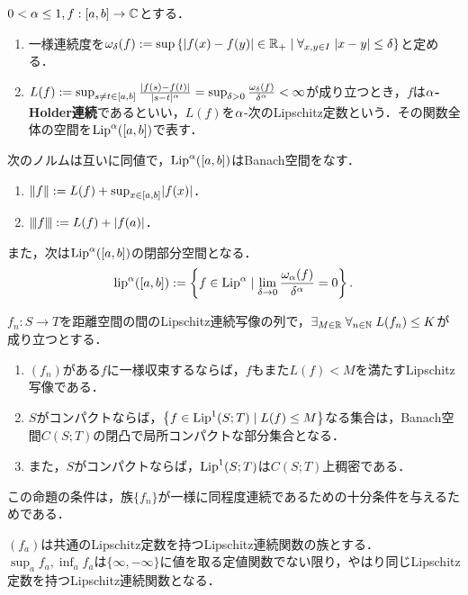 \documentclass[uplatex,dvipdfmx]{jsreport}
\begin{document}
\begin{definition}
    $0<\alpha\le1,f:[a,b]\to\mathbb{C}$とする．
    \begin{enumerate}
        \item 一様連続度を$\omega_\delta(f):=\sup\left\{\lvert f(x)-f(y)\rvert\in\mathbb{R}_+\mid\forall_{x,y\in I}\;\lvert x-y\rvert\le\delta\right\}$と定める．
        \item $L(f):=\sup_{s\ne t\in[a,b]}\frac{\lvert f(s)-f(t)\rvert}{\lvert s-t\rvert^\alpha}=\sup_{\delta>0}\frac{\omega_\delta(f)}{\delta^\alpha}<\infty$が成り立つとき，$f$は\textbf{$\alpha$-Holder連続}であるといい，$L(f)$を$\alpha$-次のLipschitz定数という．その関数全体の空間を$\mathrm{Lip}^\alpha([a,b])$で表す．
    \end{enumerate}
\end{definition}

\begin{proposition}
    次のノルムは互いに同値で，$\mathrm{Lip}^\alpha([a,b])$はBanach空間をなす．
    \begin{enumerate}
        \item $\|f\|:=L(f)+\sup_{x\in[a,b]}\lvert f(x)\rvert$．
        \item ${\left\vert\kern-0.25ex\left\vert\kern-0.25ex\left\vert f \right\vert\kern-0.25ex\right\vert\kern-0.25ex\right\vert}:=L(f)+\lvert f(a)\rvert$．
    \end{enumerate}
    また，次は$\mathrm{Lip}^\alpha([a,b])$の閉部分空間となる．
    \[\textrm{lip}^\alpha([a,b]):=\left\{f\in\mathrm{Lip}^\alpha\mid\lim_{\delta\to0}\frac{\omega_\alpha(f)}{\delta^\alpha}=0\right\}.\]
\end{proposition}

\begin{proposition}
    $f_n:S\to T$を距離空間の間のLipschitz連続写像の列で，$\exists_{M\in\mathbb{R}}\;\forall_{n\in\mathbb{N}}\;L(f_n)\le K$が成り立つとする．
    \begin{enumerate}
        \item $(f_n)$がある$f$に一様収束するならば，$f$もまた$L(f)<M$を満たすLipschitz写像である．
        \item $S$がコンパクトならば，$\left\{f\in\mathrm{Lip}^1(S;T)\mid L(f)\le M\right\}$なる集合は，Banach空間$C(S;T)$の閉凸で局所コンパクトな部分集合となる．
        \item また，$S$がコンパクトならば，$\mathrm{Lip}^1(S;T)$は$C(S;T)$上稠密である．
    \end{enumerate}
\end{proposition}
\begin{remarks}
    この命題の条件は，族$\{f_n\}$が一様に同程度連続であるための十分条件を与えるためである．
\end{remarks}


\begin{corollary}
    $(f_a)$は共通のLipschitz定数を持つLipschitz連続関数の族とする．
    $\sup_a f_a,\inf_af_a$は$\{\infty,-\infty\}$に値を取る定値関数でない限り，やはり同じLipschitz定数を持つLipschitz連続関数となる．
\end{corollary}
\end{document}
